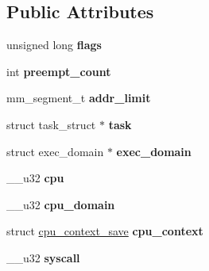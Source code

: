\subsection*{Public Attributes}
\begin{DoxyCompactItemize}
\item 
\hypertarget{structthread__info_a30a0c1f188304799e5b5eddaa4582978}{}unsigned long {\bfseries flags}\label{structthread__info_a30a0c1f188304799e5b5eddaa4582978}

\item 
\hypertarget{structthread__info_a14a02bcea296fa3daa7994859c100b20}{}int {\bfseries preempt\+\_\+count}\label{structthread__info_a14a02bcea296fa3daa7994859c100b20}

\item 
\hypertarget{structthread__info_ac23e46f4f2b7a7dd9b0582975bfbf566}{}mm\+\_\+segment\+\_\+t {\bfseries addr\+\_\+limit}\label{structthread__info_ac23e46f4f2b7a7dd9b0582975bfbf566}

\item 
\hypertarget{structthread__info_a5f7f68935e733720ffb7a7834236f0c8}{}struct task\+\_\+struct $\ast$ {\bfseries task}\label{structthread__info_a5f7f68935e733720ffb7a7834236f0c8}

\item 
\hypertarget{structthread__info_a6970bd0b0fb97acde857b994ed189f7c}{}struct exec\+\_\+domain $\ast$ {\bfseries exec\+\_\+domain}\label{structthread__info_a6970bd0b0fb97acde857b994ed189f7c}

\item 
\hypertarget{structthread__info_a4859da6617dc0189d2abcc29a7d618a6}{}\+\_\+\+\_\+u32 {\bfseries cpu}\label{structthread__info_a4859da6617dc0189d2abcc29a7d618a6}

\item 
\hypertarget{structthread__info_ac50712e75e5a6d00a0c3ee4ffa4f5895}{}\+\_\+\+\_\+u32 {\bfseries cpu\+\_\+domain}\label{structthread__info_ac50712e75e5a6d00a0c3ee4ffa4f5895}

\item 
\hypertarget{structthread__info_abc03621d6a02249568f2088f3c589671}{}struct \hyperlink{structcpu__context__save}{cpu\+\_\+context\+\_\+save} {\bfseries cpu\+\_\+context}\label{structthread__info_abc03621d6a02249568f2088f3c589671}

\item 
\hypertarget{structthread__info_a77fd52103e654cdd445172b5657d409a}{}\+\_\+\+\_\+u32 {\bfseries syscall}\label{structthread__info_a77fd52103e654cdd445172b5657d409a}


\end{DoxyCompactItemize}
